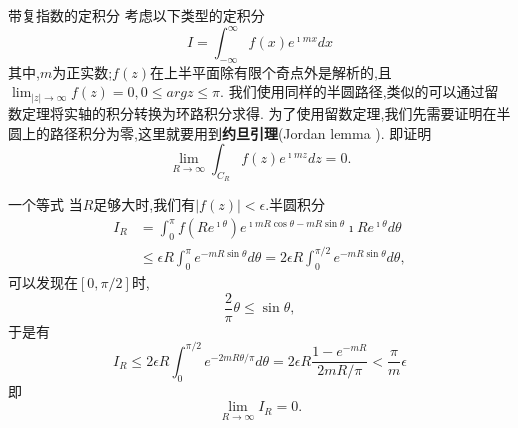 \documentclass[fontset=windows, chinese, 10pt]{beamer}
\begin{document}
\begin{frame}{带复指数的定积分}
\small
考虑以下类型的定积分
 \begin{equation}
    I=\int_{-\infty}^{\infty} f(x) e^{\imath m x} d x
\end{equation}
其中,$m$为正实数;$f(z)$在上半平面除有限个奇点外是解析的,且$\lim_{|z|\to \infty} f(z) = 0, 0 \leq arg z \leq \pi$.
我们使用同样的半圆路径,类似的可以通过留数定理将实轴的积分转换为环路积分求得.
为了使用留数定理,我们先需要证明在半圆上的路径积分为零,这里就要用到\textbf{约旦引理}(Jordan lemma
).
即证明
\begin{equation}
    \lim _{R \rightarrow \infty} \int_{C_R} f(z) e^{\imath m z} d z=0 .
\end{equation}

\end{frame}

  \begin{frame}{一个等式}
当$R$足够大时,我们有$|f(z)| < \epsilon$.半圆积分
\begin{align}
    I_R&=\int_0^\pi f\left(R e^{\imath \theta}\right) 
    e^{\imath m R \cos \theta- m R \sin \theta} \imath R e^{\imath \theta} d \theta
    \\
    &\leq \epsilon R \int_0^\pi e^{-m R \sin \theta} d \theta=2 \epsilon R \int_0^{\pi / 2} e^{-m R \sin \theta} d \theta,
\end{align}
可以发现在$\left[ 0, \pi/2\right]$时,
\begin{equation}
    \frac{2}{\pi}\theta \leq \sin{\theta},
\end{equation}
于是有
\begin{equation}
    I_R \leq 2 \epsilon R \int_0^{\pi / 2} e^{-2 m R \theta / \pi} d \theta=2 \epsilon R \frac{1-e^{-m R}}{2 m R / \pi}<\frac{\pi}{m} \epsilon
\end{equation}
即
\begin{equation}
    \lim_{R\to \infty} I_R = 0.
\end{equation}

  \end{frame}
  
\end{document}
